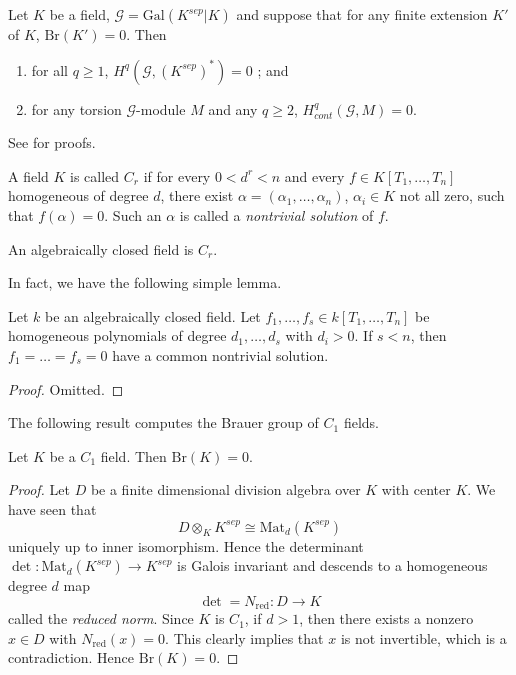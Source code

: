 \begin{proposition}
\label{proposition-serre-galois}
Let $K$ be a field, $\mathcal{G} = \text{Gal}(K^{sep}|K)$ and suppose that for
any finite extension $K'$ of $K$, $\text{Br}(K') = 0$. Then
\begin{enumerate}
\item
for all $ q \geq 1$, $H^q (\mathcal{G},(K^{sep})^*) = 0$ ; and
\item
for any torsion $\mathcal{G}$-module $M$ and any $q \geq 2$, $H_{cont}^q
(\mathcal{G},M) = 0$.
\end{enumerate}
\end{proposition}

\noindent
See \cite{SerreGaloisCohomology} for proofs.


\begin{definition}
\label{definition-Cr}
A field $K$ is called {\it $C_r$}
if for every $0 < d^r < n$ and every $f \in K[T_1,
\ldots, T_n]$ homogeneous of degree $d$, there exist $\alpha = (\alpha_1,
\ldots, \alpha_n)$, $\alpha_i \in K$ not all zero, such that $f(\alpha) = 0$.
Such an $\alpha$ is called a {\it nontrivial solution} of $f$.
\end{definition}

\begin{example}
\label{example-algebraically-closed-field-Cr}
An algebraically closed field is $C_r$.
\end{example}

\noindent
In fact, we have the following simple lemma.

\begin{lemma}
\label{lemma-algebraically-closed-find-solutions}
Let $k$ be an algebraically closed field. Let
$f_1, \ldots, f_s \in k[T_1, \ldots, T_n]$
be homogeneous polynomials of degree $d_1, \ldots, d_s$ with $d_i
> 0$. If $s < n$, then $f_1 = \ldots = f_s = 0$ have a common nontrivial
solution.
\end{lemma}

\begin{proof}
Omitted.
\end{proof}

\noindent
The following result computes the Brauer group of $C_1$ fields.

\begin{theorem}
\label{theorem-C1-brauer-group-zero}
Let $K$ be a $C_1$ field. Then $\text{Br}(K) = 0$.
\end{theorem}

\begin{proof}
Let $D$ be a finite dimensional division algebra over $K$ with center $K$. We
have seen that
$$
D \otimes_K K^{sep} \cong \text{Mat}_d(K^{sep})
$$
uniquely up to inner isomorphism. Hence the determinant $\det :
\text{Mat}_d(K^{sep}) \to K^{sep}$ is Galois invariant and descends to a
homogeneous degree $d$ map
$$
\det = N_\text{red} : D \longrightarrow K
$$
called the {\it reduced norm}. Since $K$ is $C_1$, if $d > 1$, then there
exists a nonzero $x \in D$ with $N_\text{red}(x) = 0$. This clearly implies
that $x$ is not invertible, which is a contradiction. Hence $\text{Br}(K) = 0$.
\end{proof}

